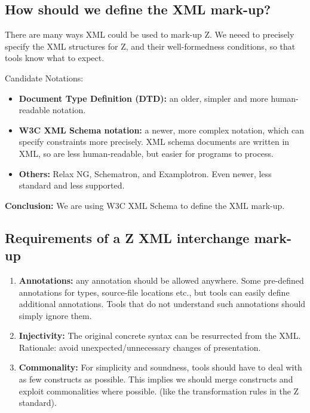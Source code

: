 \documentclass[%
   slidesonly,%
   semhelv,%
   landscape]{seminar}
\begin{document}
\begin{slide}
\section{How should we define the XML mark-up?}

There are many ways XML could be used to mark-up Z.
We neeed to precisely specify the XML structures for Z,
and their well-formedness conditions, so that tools
know what to expect.

Candidate Notations:
\begin{itemize}
\item \textbf{Document Type Definition (DTD):} an older, simpler and
  more human-readable notation.
\item \textbf{W3C XML Schema notation:} a newer, more complex notation, which
  can specify constraints more precisely.  
  XML schema documents are written in XML, so are less human-readable,
  but easier for programs to process.
\item \textbf{Others:} Relax NG, Schematron, and Examplotron.
  Even newer, less standard and less supported.
\end{itemize}

\textbf{Conclusion:} We are using W3C XML Schema to define the XML mark-up.
\end{slide}


\begin{slide}
\section{Requirements of a Z XML interchange mark-up}

\begin{enumerate}
\item \textbf{Annotations:} any annotation should be allowed anywhere.
Some pre-defined annotations for types, source-file locations etc., but
tools can easily define additional annotations.  Tools that do not
understand such annotations should simply ignore them.

\item \textbf{Injectivity:}
The original concrete syntax can be resurrected from the XML.
Rationale: avoid unexpected/unnecessary changes of presentation.

\item \textbf{Commonality:}
For simplicity and soundness, tools should have to deal 
with as few constructs as possible.  This implies we should
merge constructs and exploit commonalities where possible.
(like the transformation rules in the Z standard).
\end{enumerate}
\end{slide}
\end{document}
